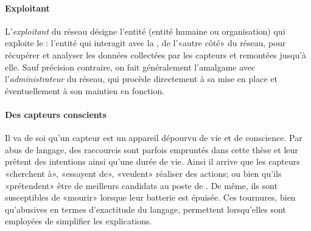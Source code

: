             \paragraph{Exploitant}
L'\textit{exploitant} du réseau désigne l'entité (entité humaine ou organisation) qui exploite le \rcsfs: l'entité qui interagit avec la \sdb, de l'«autre côté» du réseau, pour récupérer et analyser les données collectées par les capteurs et remontées jusqu'à elle.
Sauf précision contraire, on fait généralement l'amalgame avec l'\textit{administrateur} du réseau, qui procède directement à sa mise en place et éventuellement à son maintien en fonction.

            \paragraph{Des capteurs conscients}
Il va de soi qu'un capteur est un appareil dépourvu de vie et de conscience.
Par abus de langage, des raccourcis sont parfois empruntés dans cette thèse et leur prêtent des intentions ainsi qu'une durée de vie.
Ainsi il arrive que les capteurs «cherchent à», «essayent de», «veulent» réaliser des actions; ou bien qu'ils «prétendent» être de meilleurs candidats au poste de \ch.
De même, ils sont susceptibles de «mourir» lorsque leur batterie est épuisée.
Ces tournures, bien qu'abusives en termes d'exactitude du langage, permettent lorsqu'elles sont employées de simplifier les explications.
